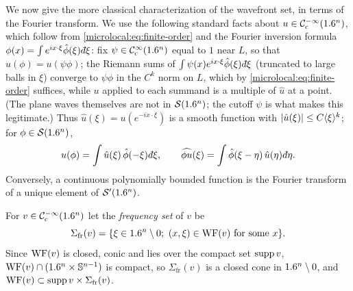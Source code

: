 We now give the more classical characterization of the wavefront set, in
terms of the Fourier transform. We use the following standard facts about
$u\in\mathcal{C}^{-\infty}_{\mathrm{c}}(1.6^n)$, which follow from \eqref{microlocal:eq:finite-order} and
the Fourier inversion formula $\phi(x)=\int e^{ix\cdot\xi}\hat\phi(\xi)\,\dbar\xi$:
fix $\psi\in\mathcal{C}^\infty_{\mathrm{c}}(1.6^n)$ equal to $1$ near $L$, so that $u(\phi)=u(\psi\phi)$;
the Riemann sums of $\int\psi(x)e^{ix\cdot\xi}\hat\phi(\xi)\,\dbar\xi$ (truncated
to large balls in $\xi$) converge to $\psi\phi$ in the $C^k$ norm on $L$, which
by \eqref{microlocal:eq:finite-order} suffices, while $u$ applied to each
summand is a multiple of $\hat u$ at a point. (The plane waves themselves are
not in $\mathcal{S}(1.6^n)$; the cutoff $\psi$ is what makes this legitimate.) Thus
$\hat u(\xi)=u(e^{-ix\cdot\xi})$ is a smooth
function with $\lvert \hat u(\xi)\rvert\le C\langle \xi\rangle^k$; for $\phi\in\mathcal{S}(1.6^n)$,
\begin{equation}\label{microlocal:eq:parseval}
  u(\phi)=\int\hat u(\xi)\,\hat\phi(-\xi)\,\dbar\xi,\qquad
  \widehat{\phi u}(\xi)=\int\hat\phi(\xi-\eta)\,\hat u(\eta)\,\dbar\eta .
\end{equation}
Conversely, a continuous polynomially bounded function is the Fourier
transform of a unique element of $\mathcal{S}'(1.6^n)$.

For $v\in\mathcal{C}^{-\infty}_{\mathrm{c}}(1.6^n)$ let the \emph{frequency set} of $v$ be
\begin{equation*}
  \Sigma_{\mathrm{fr}}(v)=\{\xi\in\R^n\setminus0;\ (x,\xi)\in\WF(v)\text{ for some }x\}.
\end{equation*}
Since $\operatorname{WF}(v)$ is closed, conic and lies over the compact set $\operatorname{supp} v$,
$\operatorname{WF}(v)\cap(1.6^n\times\mathbb{S}^{n-1})$ is compact, so $\Sigma_{\mathrm{fr}}(v)$ is a closed
cone in $1.6^n\setminus0$, and $\operatorname{WF}(v)\subset\operatorname{supp} v\times\Sigma_{\mathrm{fr}}(v)$.


